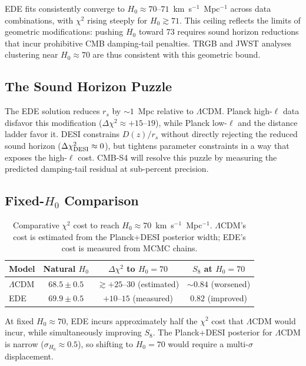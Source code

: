 \documentclass[a4paper,11pt]{article}
\begin{document}
EDE fits consistently converge to $H_0 \approx 70$--$71$~km~s$^{-1}$~Mpc$^{-1}$ across data combinations, with $\chi^2$ rising steeply for $H_0 \gtrsim 71$. This ceiling reflects the limits of geometric modifications: pushing $H_0$ toward 73 requires sound horizon reductions that incur prohibitive CMB damping-tail penalties. TRGB and JWST analyses clustering near $H_0 \approx 70$ are thus consistent with this geometric bound.

\subsection*{The Sound Horizon Puzzle}

The EDE solution reduces $r_s$ by $\sim 1$~Mpc relative to $\Lambda$CDM. Planck high-$\ell$ data disfavor this modification ($\Delta\chi^2 \approx +15$--$19$), while Planck low-$\ell$ and the distance ladder favor it. DESI constrains $D(z)/r_s$ without directly rejecting the reduced sound horizon ($\Delta\chi^2_{\rm DESI} \approx 0$), but tightens parameter constraints in a way that exposes the high-$\ell$ cost. CMB-S4 will resolve this puzzle by measuring the predicted damping-tail residual at sub-percent precision.

\subsection*{Fixed-$H_0$ Comparison}
\label{sec:fixed_h0_comparison}

\begin{table}[h]
\centering
\caption{Comparative $\chi^2$ cost to reach $H_0 \approx 70$~km~s$^{-1}$~Mpc$^{-1}$. $\Lambda$CDM's cost is estimated from the Planck+DESI posterior width; EDE's cost is measured from MCMC chains.}
\label{tab:price_of_admission}
\begin{tabular}{lccc}
\toprule
\textbf{Model} & \textbf{Natural $H_0$} & \textbf{$\Delta\chi^2$ to $H_0 = 70$} & \textbf{$S_8$ at $H_0 = 70$} \\
\midrule
$\Lambda$CDM & $68.5 \pm 0.5$ & $\gtrsim +25$--$30$ (estimated) & $\sim 0.84$ (worsened) \\
EDE & $69.9 \pm 0.5$ & $+10$--$15$ (measured) & $0.82$ (improved) \\
\bottomrule
\end{tabular}
\end{table}

At fixed $H_0 \approx 70$, EDE incurs approximately half the $\chi^2$ cost that $\Lambda$CDM would incur, while simultaneously improving $S_8$. The Planck+DESI posterior for $\Lambda$CDM is narrow ($\sigma_{H_0} \approx 0.5$), so shifting to $H_0 = 70$ would require a multi-$\sigma$ displacement.
\end{document}
